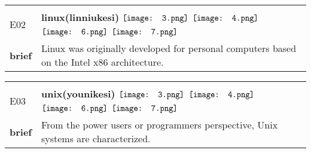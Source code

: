 \documentclass[UTF8]{article}
\begin{document}
            \begin{tabularx}{\textwidth}{p{1.5cm}X}
            \arrayrulecolor{myBlue}
        	\hline\\
            \small{E02}&
            \large{\bfseries{linux(linniukesi)}}\hfill
                                                \phantom{$\vcenter{\hbox{\texttt{[image: 1.png]}}}$}
                                                                \phantom{$\vcenter{\hbox{\texttt{[image: 2.png]}}}$}
                                                                $\vcenter{\hbox{\texttt{[image: 3.png]}}}$
                                                                $\vcenter{\hbox{\texttt{[image: 4.png]}}}$
                                                                \phantom{$\vcenter{\hbox{\texttt{[image: 5.png]}}}$}
                                                                $\vcenter{\hbox{\texttt{[image: 6.png]}}}$
                                                                $\vcenter{\hbox{\texttt{[image: 7.png]}}}$
                                        \\[10pt]
            \large{\bfseries{brief}}&\noindent\parbox[c]{\hsize}{Linux was originally developed for personal computers based on the Intel x86 architecture.} \\[5pt]
            \hline\\[-10pt]
        \end{tabularx}
            \begin{tabularx}{\textwidth}{p{1.5cm}X}
            \arrayrulecolor{myBlue}
        	\hline\\
            \small{E03}&
            \large{\bfseries{unix(younikesi)}}\hfill
                                                \phantom{$\vcenter{\hbox{\texttt{[image: 1.png]}}}$}
                                                                \phantom{$\vcenter{\hbox{\texttt{[image: 2.png]}}}$}
                                                                $\vcenter{\hbox{\texttt{[image: 3.png]}}}$
                                                                $\vcenter{\hbox{\texttt{[image: 4.png]}}}$
                                                                \phantom{$\vcenter{\hbox{\texttt{[image: 5.png]}}}$}
                                                                $\vcenter{\hbox{\texttt{[image: 6.png]}}}$
                                                                $\vcenter{\hbox{\texttt{[image: 7.png]}}}$
                                        \\[10pt]
            \large{\bfseries{brief}}&\noindent\parbox[c]{\hsize}{From the power users or programmers perspective, Unix systems are characterized.} \\[5pt]
            \hline\\[-10pt]
        \end{tabularx}
\end{document}

